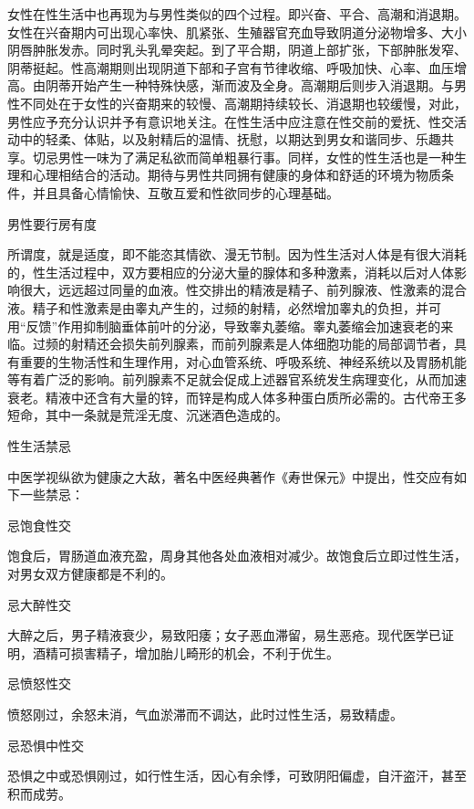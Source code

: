 \documentclass[12pt,UTF8]{ctexbook}
\begin{document}
女性在性生活中也再现为与男性类似的四个过程。即兴奋、平合、高潮和消退期。女性在兴奋期内可出现心率快、肌紧张、生殖器官充血导致阴道分泌物增多、大小阴唇肿胀发赤。同时乳头乳晕突起。到了平合期，阴道上部扩张，下部肿胀发窄、阴蒂挺起。性高潮期则出现阴道下部和子宫有节律收缩、呼吸加快、心率、血压增高。由阴蒂开始产生一种特殊快感，渐而波及全身。高潮期后则步入消退期。与男性不同处在于女性的兴奋期来的较慢、高潮期持续较长、消退期也较缓慢，对此，男性应予充分认识并予有意识地关注。在性生活中应注意在性交前的爱抚、性交活动中的轻柔、体贴，以及射精后的温情、抚慰，以期达到男女和谐同步、乐趣共享。切忌男性一味为了满足私欲而简单粗暴行事。同样，女性的性生活也是一种生理和心理相结合的活动。期待与男性共同拥有健康的身体和舒适的环境为物质条件，并且具备心情愉快、互敬互爱和性欲同步的心理基础。





男性要行房有度


所谓度，就是适度，即不能恣其情欲、漫无节制。因为性生活对人体是有很大消耗的，性生活过程中，双方要相应的分泌大量的腺体和多种激素，消耗以后对人体影响很大，远远超过同量的血液。性交排出的精液是精子、前列腺液、性激素的混合液。精子和性激素是由睾丸产生的，过频的射精，必然增加睾丸的负担，并可用“反馈”作用抑制脑垂体前叶的分泌，导致睾丸萎缩。睾丸萎缩会加速衰老的来临。过频的射精还会损失前列腺素，而前列腺素是人体细胞功能的局部调节者，具有重要的生物活性和生理作用，对心血管系统、呼吸系统、神经系统以及胃肠机能等有着广泛的影响。前列腺素不足就会促成上述器官系统发生病理变化，从而加速衰老。精液中还含有大量的锌，而锌是构成人体多种蛋白质所必需的。古代帝王多短命，其中一条就是荒淫无度、沉迷酒色造成的。





性生活禁忌


中医学视纵欲为健康之大敌，著名中医经典著作《寿世保元》中提出，性交应有如下一些禁忌：

忌饱食性交

饱食后，胃肠道血液充盈，周身其他各处血液相对减少。故饱食后立即过性生活，对男女双方健康都是不利的。

忌大醉性交

大醉之后，男子精液衰少，易致阳痿；女子恶血滞留，易生恶疮。现代医学已证明，酒精可损害精子，增加胎儿畸形的机会，不利于优生。

忌愤怒性交

愤怒刚过，余怒未消，气血淤滞而不调达，此时过性生活，易致精虚。

忌恐惧中性交

恐惧之中或恐惧刚过，如行性生活，因心有余悸，可致阴阳偏虚，自汗盗汗，甚至积而成劳。
\end{document}
